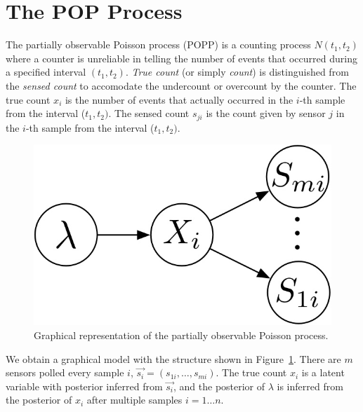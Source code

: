 \section{The POP Process}
\label{sec:popp}

The partially observable Poisson process (POPP) is a counting process $N(t_1, t_2)$ where a counter is unreliable in telling the number of events that occurred during a specified interval $(t_1, t_2)$. \emph{True count} (or simply \emph{count}) is distinguished from the \emph{sensed count} to accomodate the undercount or overcount by the counter. The true count $x_i$ is the number of events that actually occurred in the $i$-th sample from the interval ($t_1, t_2)$. The sensed count $s_{ji}$ is the count given by sensor $j$ in the $i$-th sample from the interval ($t_1, t_2)$.

\begin{figure}
\centering
\includegraphics[width=0.6\columnwidth]{./figures/graphical-model.jpg}
\caption{Graphical representation of the partially observable Poisson process.}
\label{fig:gm}
\end{figure}

We obtain a graphical model with the structure shown in Figure~\ref{fig:gm}. There are $m$ sensors polled every sample $i$, $\overrightarrow{s_i}= (s_{1i}, \ldots, s_{mi})$. The true count $x_i$ is a latent variable with posterior inferred from $\overrightarrow{s_i}$, and the posterior of $\lambda$ is inferred from the posterior of $x_i$ after multiple samples $i = 1 \ldots n$.

